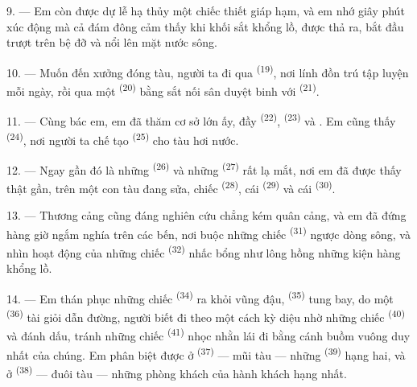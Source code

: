 9. --- Em còn được dự lễ hạ thủy một chiếc thiết giáp hạm, và em nhớ giây phút xúc động
mà cả đám đông cảm thấy khi khối sắt khổng lồ, được thả ra, bắt đầu trượt trên bệ đỡ và
nổi lên mặt nước sông.

10. --- Muốn đến xưởng đóng tàu, người ta đi qua 
\textsuperscript{(19)}, nơi lính đồn trú tập luyện mỗi ngày, rồi qua một  \textsuperscript{(20)} bằng sắt nối sân duyệt binh với 
\textsuperscript{(21)}.

\VUsaut{3.0mm}
\VUsaut{3.0mm}

11. --- Cùng bác em, em đã thăm cơ sở lớn ấy, đầy 
\textsuperscript{(22)},  \textsuperscript{(23)} và . Em cũng thấy  \textsuperscript{(24)}, nơi người ta chế tạo
 \textsuperscript{(25)} cho tàu hơi nước.

12. --- Ngay gần đó là những  \textsuperscript{(26)} và những
 \textsuperscript{(27)} rất lạ mắt, nơi em đã được thấy thật gần, trên một
con tàu đang sửa, chiếc  \textsuperscript{(28)}, cái 
\textsuperscript{(29)} và cái  \textsuperscript{(30)}.

13. --- Thương cảng cũng đáng nghiên cứu chẳng kém quân cảng, và em đã đứng hàng giờ
ngắm nghía trên các bến, nơi buộc những chiếc 
\textsuperscript{(31)} ngược dòng sông, và nhìn hoạt động của những chiếc  \textsuperscript{(32)} nhấc bổng như lông hồng những kiện hàng khổng
lồ.

\VUsaut{4.0mm}
\VUsaut{3.0mm}

14. --- Em thán phục những chiếc 
\textsuperscript{(34)} ra khỏi vũng đậu,  \textsuperscript{(35)} tung
bay, do một  \textsuperscript{(36)} tài giỏi dẫn đường, người biết đi
theo  một cách kỳ diệu nhờ những chiếc 
\textsuperscript{(40)} và  đánh dấu, tránh những chiếc  \textsuperscript{(41)} nhọc nhằn lái đi bằng cánh buồm vuông duy nhất của chúng. Em
phân biệt được ở  \textsuperscript{(37)} --- mũi tàu --- những
 \textsuperscript{(39)} hạng hai, và ở 
\textsuperscript{(38)} --- đuôi tàu --- những phòng khách của hành khách hạng nhất.

